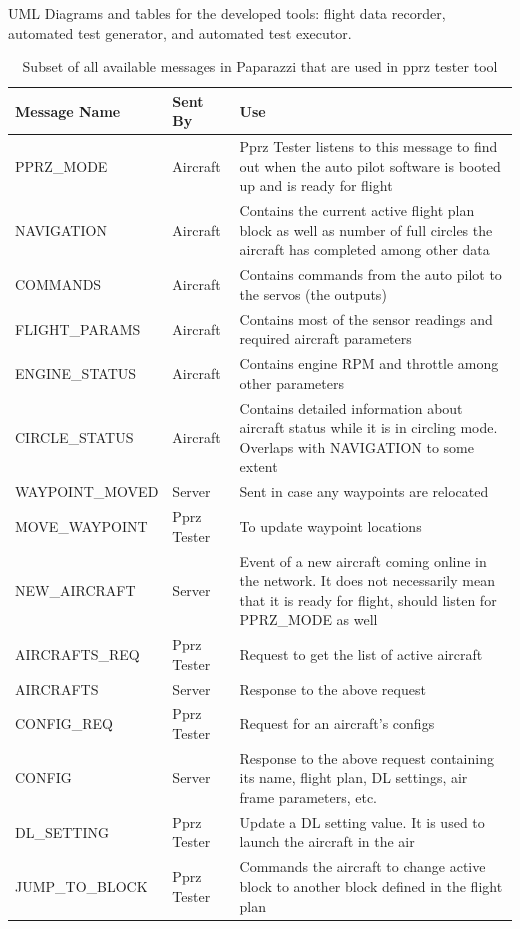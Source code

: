 UML Diagrams and tables for the developed tools: flight data recorder, automated test generator, and automated test executor.
\begin{table}[]
    \centering
\begin{longtable}{llp{}}
\toprule
\textbf{Message Name }   & \textbf{Sent By }    & \textbf{Use}                                                                     \\ \hline
\endhead
%
\hline
\endfoot
%
\endlastfoot
%
PPRZ\_MODE &
  Aircraft &
  Pprz Tester listens to this message to find out when the auto pilot software is booted up and is ready for flight \\
NAVIGATION &
  Aircraft &
  Contains the current active flight plan block as well as number of full circles the aircraft has completed among other data \\
COMMANDS        & Aircraft    & Contains commands from the auto pilot to the servos (the outputs)       \\
FLIGHT\_PARAMS  & Aircraft    & Contains most of the sensor readings and required aircraft parameters   \\
ENGINE\_STATUS  & Aircraft    & Contains engine RPM and throttle among other parameters                 \\
CIRCLE\_STATUS &
  Aircraft &
  Contains detailed information about aircraft status while it is in circling mode. Overlaps with NAVIGATION to some extent \\
WAYPOINT\_MOVED & Server      & Sent in case any waypoints are relocated                                \\
MOVE\_WAYPOINT  & Pprz Tester & To update waypoint locations                                            \\
NEW\_AIRCRAFT &
  Server &
  Event of a new aircraft coming online in the network. It does not necessarily mean that it is ready for flight, should listen for PPRZ\_MODE as well \\
AIRCRAFTS\_REQ  & Pprz Tester & Request to get the list of active aircraft                              \\
AIRCRAFTS       & Server      & Response to the above request                                           \\
CONFIG\_REQ     & Pprz Tester & Request for an aircraft's configs                                       \\
CONFIG &
  Server &
  Response to the above request containing  its name, flight plan, DL settings, air frame parameters, etc. \\
DL\_SETTING     & Pprz Tester & Update a DL setting value. It is used to launch the aircraft in the air \\
JUMP\_TO\_BLOCK & Pprz Tester & Commands the aircraft to change active block to another block defined in the flight plan  \\ \bottomrule
\end{longtable}
\caption{Subset of all available messages in Paparazzi that are used in pprz tester tool}
\label{tab:pprz_messages}
\end{table}

